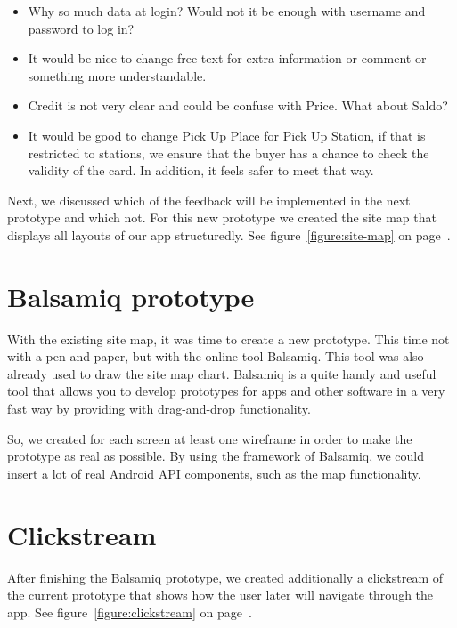 \documentclass[11pt,twoside,a4paper]{report}
\begin{document}
\begin{itemize}
\item Why so much data at login? Would not it be enough with username and password to log in?

\item It would be nice to change free text for extra information or comment or something more understandable.

\item Credit is not very clear and could be confuse with Price. What about Saldo?

\item It would be good to change Pick Up Place for Pick Up Station, if that is restricted to stations, we ensure that the buyer has a chance to check the validity of the card. In addition, it feels safer to meet that way.

\end{itemize}

Next, we discussed which of the feedback will be implemented in the next prototype and which not. For this new prototype we created the site map that displays all layouts of our app structuredly. See figure~\ref{figure:site-map} on page~\pageref{figure:site-map}.

\section{Balsamiq prototype}

With the existing site map, it was time to create a new prototype. This time not with a pen and paper, but with the online tool Balsamiq. This tool was also already used to draw the site map chart. Balsamiq is a quite handy and useful tool that allows you to develop prototypes for apps and other software in a very fast way by providing with drag-and-drop functionality.

So, we created for each screen at least one wireframe in order to make the prototype as real as possible. By using the framework of Balsamiq, we could
insert a lot of real Android API components, such as the map functionality.

\section{Clickstream}

After finishing the Balsamiq prototype, we created additionally a clickstream of the current prototype that shows how the user later will navigate through the app. See figure~\ref{figure:clickstream} on page~\pageref{figure:clickstream}.
\end{document}
